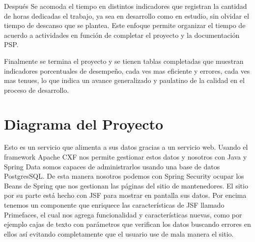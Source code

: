 \documentclass[a4paper,12pt,openany,oneside]{book}
\begin{document}
Después Se acomoda el tiempo en distintos indicadores que registran la cantidad de horas dedicadas el trabajo, ya sea en desarrollo como en estudio, sin olvidar el tiempo de descanso que se plantea. Este enfoque permite organizar el tiempo de acuerdo a actividades en función de completar el proyecto y la documentación PSP.

Finalmente se termina el proyecto y se tienen tablas completadas que muestran indicadores porcentuales de desempeño, cada ves mas eficiente y errores, cada ves mas tenues, lo que indica un avance generalizado y paulatino de la calidad en el proceso de desarrollo.
\section{Diagrama del Proyecto}
Esto es un servicio que alimenta a sus datos gracias a un servicio web. Usando el framework Apache CXF nos permite gestionar estos datos y nosotros con Java y Spring Data somos capaces de administrarlos usando una base de datos PostgresSQL. De esta manera nosotros podemos con Spring Security ocupar los Beans de Spring que nos gestionan las páginas del sitio de mantenedores. El sitio por su parte está hecho con JSF para mostrar en pantalla sus datos. Por encima tenemos un componente que enriquece las características de JSF llamado Primefaces, el cual nos agrega funcionalidad y características nuevas, como por ejemplo cajas de texto con parámetros que verifican los datos buscando errores en ellos así evitando completamente que el usuario use de mala manera el sitio.
\end{document}

